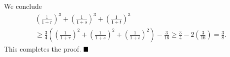 \documentclass[11pt]{article}
\begin{document}
\begin{enumerate}
We conclude
\begin{align*}
& \left(\frac{1}{1 + r}\right)^{3} + \left(\frac{1}{1 + s}\right)^{3} + \left(\frac{1}{1 + t}\right)^{3}\\
& \geqslant \frac{3}{4}\left(\left(\frac{1}{1 + r}\right)^{2} + \left(\frac{1}{1 + s}\right)^{2} + \left(\frac{1}{1 + t}\right)^{2}\right) - \frac{3}{16} \geqslant \frac{3}{4} - 2\left(\frac{3}{16}\right) = \frac{3}{8}.
\end{align*}
This completes the proof. $\hfill\blacksquare$
\end{enumerate}
\end{document}
